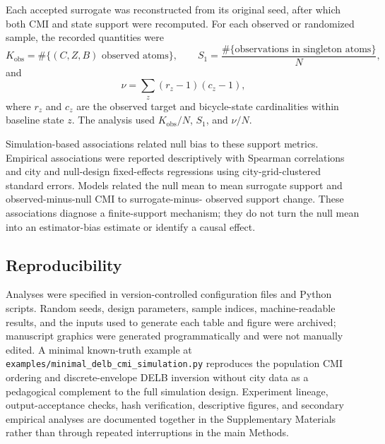 Each accepted surrogate was reconstructed from its original seed, after which
both CMI and state support were recomputed. For each observed or randomized
sample, the recorded quantities were
\begin{equation}
K_{\mathrm{obs}}
=\#\{(C,Z,B)\text{ observed atoms}\},
\qquad
S_1
=\frac{\#\{\text{observations in singleton atoms}\}}{N},
\label{eq:e13_support_metrics}
\end{equation}
and
\begin{equation}
\nu=\sum_z(r_z-1)(c_z-1),
\label{eq:e13_effective_df}
\end{equation}
where \(r_z\) and \(c_z\) are the observed target and bicycle-state
cardinalities within baseline state \(z\). The analysis used
\(K_{\mathrm{obs}}/N\), \(S_1\), and \(\nu/N\).

Simulation-based associations related null bias to these support
metrics. Empirical associations were reported descriptively with
Spearman correlations and city and null-design fixed-effects regressions
using city-grid-clustered standard errors. Models related the null mean to
mean surrogate support and observed-minus-null CMI to surrogate-minus-
observed support change. These associations diagnose a finite-support
mechanism; they do not turn the null mean into an estimator-bias estimate or
identify a causal effect.

\subsection{Reproducibility}
\label{subsec:reproducibility}

Analyses were specified in version-controlled configuration files and Python
scripts. Random seeds, design parameters, sample indices, machine-readable
results, and the inputs used to generate each table and figure were archived;
manuscript graphics were generated programmatically and were not manually
edited. A minimal known-truth example at
\texttt{examples/minimal\_delb\_cmi\_simulation.py} reproduces the population
CMI ordering and discrete-envelope DELB inversion without city data as a
pedagogical complement to the full simulation design. Experiment
lineage, output-acceptance checks, hash verification, descriptive figures, and
secondary empirical analyses are documented together in the Supplementary
Materials rather than through repeated interruptions in the main Methods.
